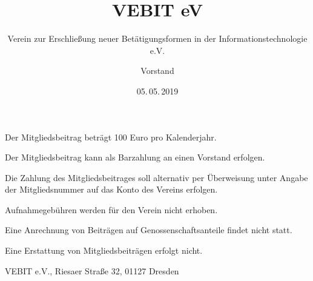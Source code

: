 \documentclass[fontsize=11pt,pagesize,parskip=half]{scrartcl}
\begin{document}
\author{Vorstand}
\subject{Beitragsordnung}
\title{VEBIT eV}
\subtitle{Verein zur Erschließung neuer Betätigungsformen in der Informationstechnologie e.V.}
\date{05.\,05.\,2019}
\maketitle



\appendix

\begin{contract}



Der Mitgliedsbeitrag beträgt 100 Euro pro Kalenderjahr.



Der Mitgliedsbeitrag kann als Barzahlung an einen Vorstand erfolgen.

Die Zahlung des Mitgliedsbeitrages soll alternativ per Überweisung unter Angabe der Mitgliedsnummer auf das Konto des Vereins erfolgen.



Aufnahmegebühren werden für den Verein nicht erhoben.

Eine Anrechnung von Beiträgen auf Genossenschaftsanteile findet nicht statt.

Eine Erstattung von Mitgliedsbeiträgen erfolgt nicht.

\end{contract}

\vfill

VEBIT e.V., Riesaer Straße 32, 01127 Dresden
\end{document}
